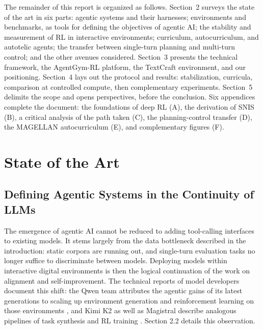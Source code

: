 \documentclass[11pt,a4paper]{article}
\begin{document}
The remainder of this report is organized as follows. Section~2 surveys the state of the art in six parts: agentic systems and their harnesses; environments and benchmarks, as tools for defining the objectives of agentic AI; the stability and measurement of RL in interactive environments; curriculum, autocurriculum, and autotelic agents; the transfer between single-turn planning and multi-turn control; and the other avenues considered. Section~3 presents the technical framework, the AgentGym-RL platform, the TextCraft environment, and our positioning. Section~4 lays out the protocol and results: stabilization, curricula, comparison at controlled compute, then complementary experiments. Section~5 delimits the scope and opens perspectives, before the conclusion. Six appendices complete the document: the foundations of deep RL (A), the derivation of SNIS (B), a critical analysis of the path taken (C), the planning-control transfer (D), the MAGELLAN autocurriculum (E), and complementary figures (F). 






\newpage
\section{State of the Art}

\subsection{Defining Agentic Systems in the Continuity of LLMs}

The emergence of agentic AI cannot be reduced to adding tool-calling interfaces to existing models. It stems largely from the data bottleneck described in the introduction: static corpora are running out, and single-turn evaluation tasks no longer suffice to discriminate between models. Deploying models within interactive digital environments is then the logical continuation of the work on alignment and self-improvement. The technical reports of model developers document this shift: the Qwen team attributes the agentic gains of its latest generations to scaling up environment generation and reinforcement learning on those environments \cite{qwen3coder2025, qwen35_2026}, and Kimi K2 as well as Magistral describe analogous pipelines of task synthesis and RL training \cite{kimik2_2025, magistral2025}. Section 2.2 details this observation.
\end{document}
